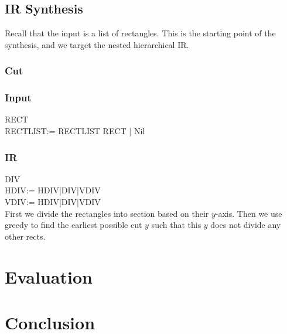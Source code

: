 \documentclass[runningheads]{llncs}
\begin{document}
\subsection{IR Synthesis}
Recall that the input is a list of rectangles. This is the starting point of the synthesis, and we target the nested hierarchical IR. 
\subsubsection{Cut}


\subsubsection{Input}
RECT\\
RECTLIST:= RECTLIST RECT | Nil
\subsubsection{IR}
DIV\\
HDIV:= HDIV|DIV|VDIV\\
VDIV:= HDIV|DIV|VDIV\\
First we divide the rectangles into section based on their $y$-axis. Then we use
greedy to find the earliest possible cut $y$ such that this $y$ does not divide any
other rects.


\section{Evaluation}
\section{Conclusion}
\end{document}

